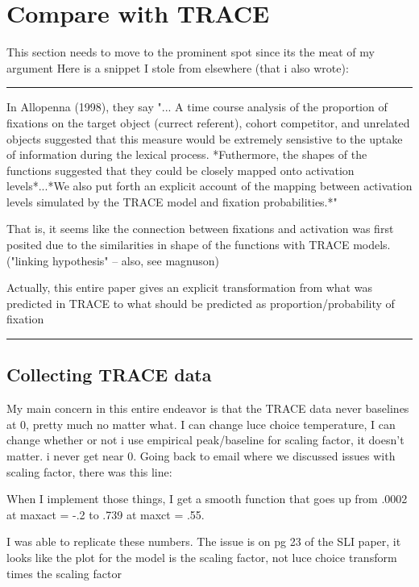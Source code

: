 \documentclass{article}
\begin{document}
\section{Compare with TRACE}

This section needs to move to the prominent spot since its the meat of my argument 
Here is a snippet I stole from elsewhere (that i also wrote):

\noindent\rule{2cm}{0.4pt}

In Allopenna (1998), they say "... A time course analysis of the proportion of fixations on the target object (currect referent), cohort competitor, and unrelated objects suggested that this measure would be extremely sensistive to the uptake of information during the lexical process. *Futhermore, the shapes of the functions suggested that they could be closely mapped onto activation levels*...*We also put forth an explicit account of the mapping between activation levels simulated by the TRACE model and fixation probabilities.*"

That is, it seems like the connection between fixations and activation was first posited due to the similarities in shape of the functions with TRACE models. ("linking hypothesis" -- also, see magnuson)

Actually, this entire paper gives an explicit transformation from what was predicted in TRACE to what should be predicted as proportion/probability of fixation

\noindent\rule{2cm}{0.4pt}

\subsection{Collecting TRACE data}

My main concern in this entire endeavor is that the TRACE data never baselines at 0, pretty much no matter what. I can change luce choice temperature, I can change whether or not i use empirical peak/baseline for scaling factor, it doesn't matter.  i never get near 0. Going back to email where we discussed issues with scaling factor, there was this line:

When I implement those things, I get a smooth function that goes up from .0002 at maxact = -.2 to .739 at maxct = .55.  

I was able to replicate these numbers. The issue is on pg 23 of the SLI paper, it looks like the plot for the model is the scaling factor, not luce choice transform times the scaling factor
\end{document}
